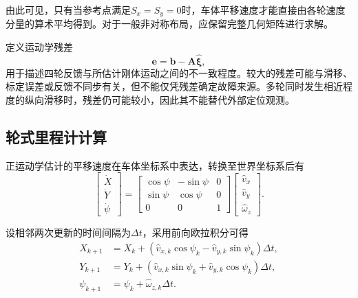 \documentclass[UTF8,12pt,a4paper,openany]{ctexbook}
\begin{document}
由此可见，只有当参考点满足$S_x=S_y=0$时，车体平移速度才能直接由各轮速度分量的算术平均得到。对于一般非对称布局，应保留完整几何矩阵进行求解。

定义运动学残差
\begin{equation}
    \boldsymbol{e}
    =
    \boldsymbol{b}
    -
    \boldsymbol{A}\hat{\boldsymbol{\xi}},
    \label{eq:kc-residual}
\end{equation}
用于描述四轮反馈与所估计刚体运动之间的不一致程度。较大的残差可能与滑移、标定误差或反馈不同步有关，但不能仅凭残差确定故障来源。多轮同时发生相近程度的纵向滑移时，残差仍可能较小，因此其不能替代外部定位观测。

\subsection{轮式里程计计算}

正运动学估计的平移速度在车体坐标系中表达，转换至世界坐标系后有
\begin{equation}
    \begin{bmatrix}
        \dot X\\
        \dot Y\\
        \dot\psi
    \end{bmatrix}
    =
    \begin{bmatrix}
        \cos\psi&-\sin\psi&0\\
        \sin\psi&\cos\psi&0\\
        0&0&1
    \end{bmatrix}
    \begin{bmatrix}
        \hat v_x\\
        \hat v_y\\
        \hat\omega_z
    \end{bmatrix}.
    \label{eq:kc-world-velocity}
\end{equation}

设相邻两次更新的时间间隔为$\Delta t$，采用前向欧拉积分可得
\begin{equation}
\begin{aligned}
    X_{k+1}
    &=
    X_k+
    \left(
        \hat v_{x,k}\cos\psi_k
        -
        \hat v_{y,k}\sin\psi_k
    \right)\Delta t,\\
    Y_{k+1}
    &=
    Y_k+
    \left(
        \hat v_{x,k}\sin\psi_k
        +
        \hat v_{y,k}\cos\psi_k
    \right)\Delta t,\\
    \psi_{k+1}
    &=
    \psi_k+\hat\omega_{z,k}\Delta t.
\end{aligned}
\label{eq:kc-odometry}
\end{equation}
\end{document}
